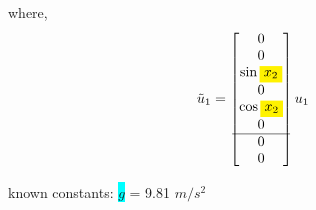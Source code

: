 \documentclass[12pt]{article}
\begin{document}
where, 
\begin{align*}
    \tilde{u}_1 &= \begin{bmatrix}
        0 \\
        0 \\
        \sin{\colorbox{yellow}{$x_2$}} \\
        0 \\
        \cos{\colorbox{yellow}{$x_2$}} \\
        0 \\
        \hline
        0 \\
        0 \\
    \end{bmatrix} u_1
\end{align*}

known constants: \colorbox{cyan}{$g$} = 9.81 $m/s^2$ \\
\end{document}
